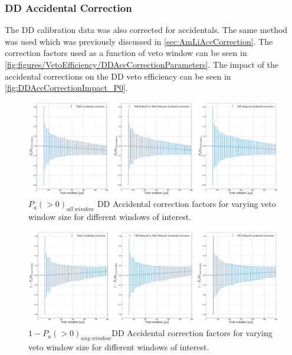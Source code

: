 \subsubsection{DD Accidental Correction}
The DD calibration data was also corrected for accidentals. The same method was used which was previously discussed in \autoref{sec:AmLiAccCorrection}. The correction factors used as a function of veto window can be seen in \autoref{fig:figures/VetoEfficiency/DDAccCorrectionParameters}. 
The impact of the accidental corrections on the DD veto efficiency can be seen in \autoref{fig:DDAccCorrectionImpact_P0}.

\begin{figure}
    \centering
    \includegraphics[width=\textwidth]{figures/VetoEfficiency/DDAccCorrectionImpact_P0.pdf}
    \caption{$P_a(>0)_{all\:window}$ DD Accidental correction factors for varying veto window size for different windows of interest.}
    \label{fig:DDAccCorrectionImpact_P0}
\end{figure}

\begin{figure}
    \centering
    \includegraphics[width=\textwidth]{figures/VetoEfficiency/DDAccCorrectionImpact_1-P0.pdf}
    \caption{$1-P_a(>0)_{any\:window}$DD Accidental correction factors for varying veto window size for different windows of interest.}
    \label{fig:figures/VetoEfficiency/DDAccCorrectionImpact_1-P0}
\end{figure}

